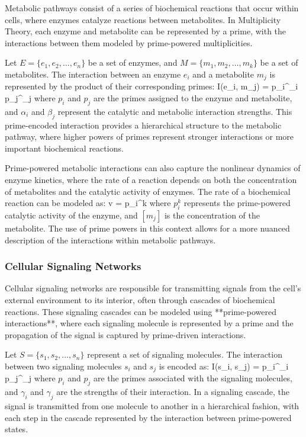 \documentclass[12pt]{article}
\begin{document}
Metabolic pathways consist of a series of biochemical reactions that occur within cells, where enzymes catalyze reactions between metabolites. In Multiplicity Theory, each enzyme and metabolite can be represented by a prime, with the interactions between them modeled by prime-powered multiplicities.

Let \( E = \{e_1, e_2, \dots, e_n\} \) be a set of enzymes, and \( M = \{m_1, m_2, \dots, m_k\} \) be a set of metabolites. The interaction between an enzyme \( e_i \) and a metabolite \( m_j \) is represented by the product of their corresponding primes:
\]
I(e_i, m_j) = p_i^{\alpha_i} p_j^{\beta_j}
\]
where \( p_i \) and \( p_j \) are the primes assigned to the enzyme and metabolite, and \( \alpha_i \) and \( \beta_j \) represent the catalytic and metabolic interaction strengths. This prime-encoded interaction provides a hierarchical structure to the metabolic pathway, where higher powers of primes represent stronger interactions or more important biochemical reactions.

Prime-powered metabolic interactions can also capture the nonlinear dynamics of enzyme kinetics, where the rate of a reaction depends on both the concentration of metabolites and the catalytic activity of enzymes. The rate of a biochemical reaction can be modeled as:
\]
v = p_i^k 
\]
where \( p_i^k \) represents the prime-powered catalytic activity of the enzyme, and \( [m_j] \) is the concentration of the metabolite. The use of prime powers in this context allows for a more nuanced description of the interactions within metabolic pathways.

\subsubsection{Cellular Signaling Networks}

Cellular signaling networks are responsible for transmitting signals from the cell’s external environment to its interior, often through cascades of biochemical reactions. These signaling cascades can be modeled using **prime-powered interactions**, where each signaling molecule is represented by a prime and the propagation of the signal is captured by prime-driven interactions.

Let \( S = \{s_1, s_2, \dots, s_n\} \) represent a set of signaling molecules. The interaction between two signaling molecules \( s_i \) and \( s_j \) is encoded as:
\]
I(s_i, s_j) = p_i^{\gamma_i} p_j^{\gamma_j}
\]
where \( p_i \) and \( p_j \) are the primes associated with the signaling molecules, and \( \gamma_i \) and \( \gamma_j \) are the strengths of their interaction. In a signaling cascade, the signal is transmitted from one molecule to another in a hierarchical fashion, with each step in the cascade represented by the interaction between prime-powered states.
\end{document}
